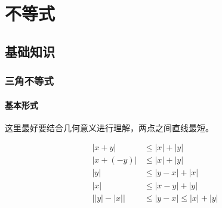 \chapter{不等式}

\section{基础知识}

\subsection{三角不等式}

\subsubsection{基本形式}

这里最好要结合几何意义进行理解，两点之间直线最短。

\begin{align*}
\lvert x + y \rvert  & \le \lvert x \rvert + \lvert y \rvert \\
\lvert x + (- y) \rvert  & \le \lvert x \rvert + \lvert y \rvert \\
\lvert y \rvert & \le \lvert y -x \rvert + \lvert x \rvert \\
\lvert x \rvert & \le \lvert x - y \rvert + \lvert y \rvert \\
\lvert \lvert y \rvert - \lvert x \rvert \rvert & \le  \lvert y - x \rvert \le \lvert x \rvert + \lvert y \rvert
\end{align*}

